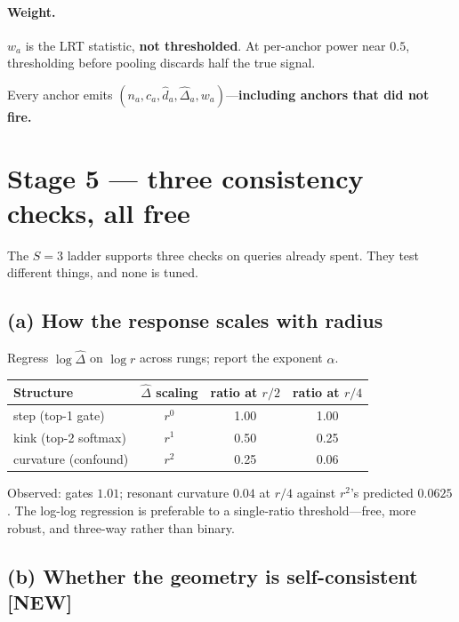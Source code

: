 \documentclass[11pt]{article}
\newcommand{\dhat}{\hat{d}}
\newcommand{\Dhat}{\hat{\Delta}}
\newcommand{\provtag}[2]{{\footnotesize\sffamily\textcolor{#1}{[#2]}}}
\newcommand{\NEWT}{\provtag{newmag}{NEW}}
\begin{document}
\paragraph{Weight.} $w_a$ is the LRT statistic, \textbf{not thresholded}. At per-anchor power
near $0.5$, thresholding before pooling discards half the true signal.

\medskip
\noindent Every anchor emits $(n_a, c_a, \dhat_a, \Dhat_a, w_a)$---\textbf{including anchors that
did not fire.}

\section{Stage 5 --- three consistency checks, all free}
\label{sec:stage5}

The $S = 3$ ladder supports three checks on queries already spent. They test different things,
and none is tuned.

\subsection*{(a) How the response scales with radius}

Regress $\log\Dhat$ on $\log r$ across rungs; report the exponent $\alpha$.

\begin{table}[h]
\small\centering
\begin{tabular}{@{}lccc@{}}
\toprule
\textbf{\sffamily Structure} & $\Dhat$ \textbf{\sffamily scaling}
  & \textbf{\sffamily ratio at} $r/2$ & \textbf{\sffamily ratio at} $r/4$\\
\midrule
step (top-1 gate)      & $r^0$ & 1.00 & 1.00\\
kink (top-2 softmax)   & $r^1$ & 0.50 & 0.25\\
curvature (confound)   & $r^2$ & 0.25 & 0.06\\
\bottomrule
\end{tabular}
\end{table}

\noindent Observed: gates $1.01$; resonant curvature $0.04$ at $r/4$ against $r^2$'s predicted
$0.0625$. The log-log regression is preferable to a single-ratio threshold---free, more robust,
and three-way rather than binary.

\subsection*{(b) Whether the geometry is self-consistent \textnormal{\NEWT}}
\end{document}
